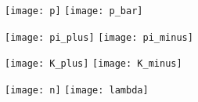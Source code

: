 \documentclass{article}
\begin{document}
\begin{figure}
\texttt{[image: p]}
\texttt{[image: p\_bar]}

\texttt{[image: pi\_plus]}
\texttt{[image: pi\_minus]}

\texttt{[image: K\_plus]}
\texttt{[image: K\_minus]}

\texttt{[image: n]}
\texttt{[image: lambda]}
\end{figure}
\end{document}
